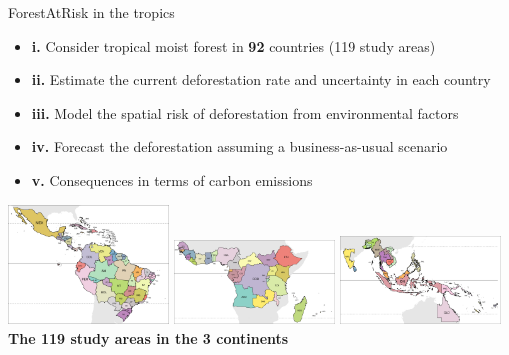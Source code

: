 \documentclass[10pt,table,dvipsnames,compress]{beamer}
\begin{document}
\begin{frame}[label={sec:org6854c2d}]{ForestAtRisk in the tropics}
\begin{itemize}
\item \textbf{i.} Consider tropical moist forest in \textbf{92} countries (119 study areas)
\item \textbf{ii.} Estimate the current deforestation rate and uncertainty in each country
\item \textbf{iii.} Model the spatial risk of deforestation from environmental factors
\item \textbf{iv.} Forecast the deforestation assuming a business-as-usual scenario
\item \textbf{v.} Consequences in terms of carbon emissions
\end{itemize}

\vspace{0.5cm}
\begin{center}
\includegraphics[width=0.32\textwidth]{figs/sm/study_areas_America}
\includegraphics[width=0.32\textwidth]{figs/sm/study_areas_Africa}
\includegraphics[width=0.32\textwidth]{figs/sm/study_areas_Asia}
\textbf{The 119 study areas in the 3 continents}
\end{center}
\end{frame}
\end{document}
